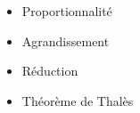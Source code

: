 \begin{prerequis}[Prérequis]    
    \begin{itemize}
        \item Proportionnalité        
        \item Agrandissement
        \item Réduction
        \item Théorème de Thalès
    \end{itemize}
\end{prerequis}
